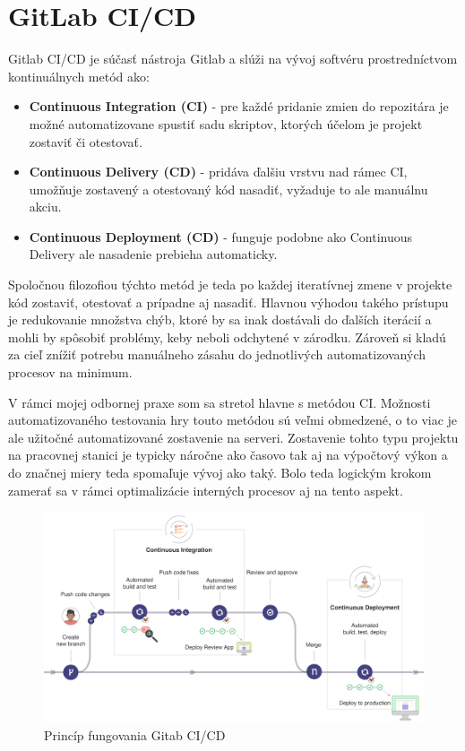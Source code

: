 \documentclass[slovak, bachelorpractice]{diploma}
\begin{document}
\section{GitLab CI/CD}
\label{sec:GitLab}
Gitlab CI/CD \cite{Cicd} je súčasť nástroja Gitlab a slúži na vývoj softvéru prostredníctvom kontinuálnych metód ako:
\begin{itemize}
  \item \textbf{Continuous Integration (CI)} - pre každé pridanie zmien do repozitára je možné automatizovane spustiť sadu skriptov, ktorých účelom je projekt zostaviť či otestovať.
  \item \textbf{Continuous Delivery (CD)} - pridáva ďalšiu vrstvu nad rámec CI, umožňuje zostavený a otestovaný kód nasadiť, vyžaduje to ale manuálnu akciu.
  \item \textbf{Continuous Deployment (CD)} - funguje podobne ako Continuous Delivery ale nasadenie prebieha automaticky.
\end{itemize}
Spoločnou filozofiou týchto metód je teda po každej iteratívnej zmene v projekte kód zostaviť, otestovať a prípadne aj nasadiť. Hlavnou výhodou takého prístupu je redukovanie množstva chýb, ktoré by sa inak dostávali do ďalších iterácií a mohli by spôsobiť problémy, keby neboli odchytené v zárodku. Zároveň si kladú za cieľ znížiť potrebu manuálneho zásahu do jednotlivých automatizovaných procesov na minimum.

V rámci mojej odbornej praxe som sa stretol hlavne s metódou CI. Možnosti automatizovaného testovania hry touto metódou sú veľmi obmedzené, o to viac je ale užitočné automatizované zostavenie na serveri. Zostavenie tohto typu projektu na pracovnej stanici je typicky náročne ako časovo tak aj na výpočtový výkon a do značnej miery teda spomaľuje vývoj ako taký. Bolo teda logickým krokom zamerať sa v rámci optimalizácie interných procesov aj na tento aspekt.

\begin{figure}[!htbp]
	\centering
	\includegraphics[width=1\textwidth]{Pictures/gitlab.png}
	\caption{Princíp fungovania Gitab CI/CD \cite{Cicd}}
	\label{pic:Gitlab}
\end{figure}
\end{document}
